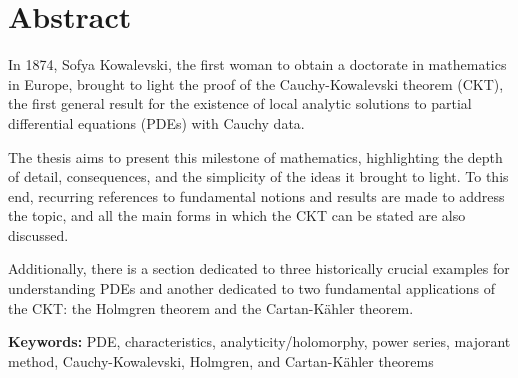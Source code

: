 \chapter*{Abstract}

In 1874, Sofya Kowalevski, the first woman to obtain a doctorate in mathematics in Europe, brought to light the proof of the Cauchy-Kowalevski theorem (CKT), the first general result for the existence of local analytic solutions to partial differential equations (PDEs) with Cauchy data.

The thesis aims to present this milestone of mathematics, highlighting the depth of detail, consequences, and the simplicity of the ideas it brought to light. To this end, recurring references to fundamental notions and results are made to address the topic, and all the main forms in which the CKT can be stated are also discussed.

Additionally, there is a section dedicated to three historically crucial examples for understanding PDEs and another dedicated to two fundamental applications of the CKT: the Holmgren theorem and the Cartan-Kähler theorem.

\vspace{6mm}
\textbf{Keywords:} PDE, characteristics, analyticity/holomorphy, power series, majorant method, Cauchy-Kowalevski, Holmgren, and Cartan-Kähler theorems

\newpage
\blankpage
